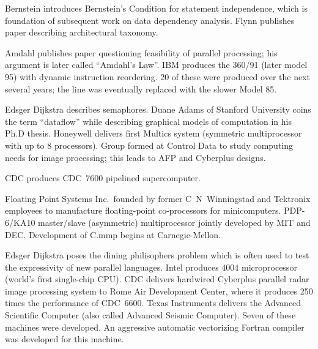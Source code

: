 	{Bernstein introduces Bernstein's Condition
	for statement independence,
	which is foundation of subsequent work on data dependency analysis.}
	{Flynn publishes paper describing architectural taxonomy.}

	{Amdahl publishes paper questioning feasibility of parallel processing;
	his argument is later called ``Amdahl's Law''.}
	{IBM produces the 360/91 (later model 95)
	with dynamic instruction reordering.
	20 of these were produced over the next several years;
	the line was eventually replaced with the slower Model 85.}

	{Edsger Dijkstra describes semaphores.}
	{Duane Adams of Stanford University coins the term ``dataflow''
	while describing graphical models of computation in his Ph.D thesis.}
	{Honeywell delivers first Multics system
	(symmetric multiprocessor with up to 8 processors).}
	{Group formed at Control Data to study computing needs for image
	processing; this leads to AFP and Cyberplus designs.}

	{CDC produces CDC~7600 pipelined supercomputer.}

	{Floating Point Systems Inc.\ founded
	by former C~N~Winningstad and Tektronix employees
	to manufacture floating-point co-processors for minicomputers.}
	{PDP-6/KA10 master/slave (asymmetric) multiprocessor
	jointly developed by MIT and DEC.}
	{Development of C.mmp begins at Carnegie-Mellon.}

	{Edsger Dijkstra poses the dining philisophers problem which is often
	used to test the expressivity of new parallel languages.}
	{Intel produces 4004 microprocessor (world's first single-chip CPU).}
	{CDC delivers hardwired Cyberplus
	parallel radar image processing system to Rome Air Development Center,
	where it produces 250 times the performance of CDC~6600.}
	{Texas Instruments delivers the Advanced Scientific Computer
	(also called Advanced Seismic Computer).
	Seven of these machines were developed.
	An aggressive automatic vectorizing Fortran compiler
	was developed for this machine.}

